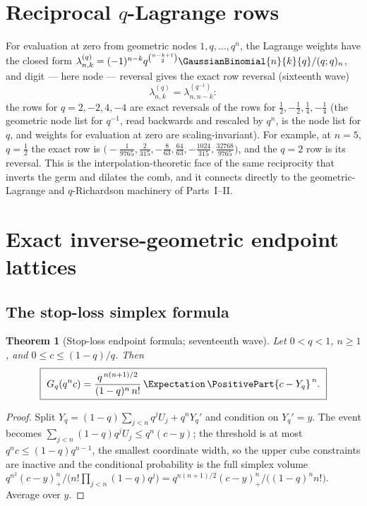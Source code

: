 \documentclass[11pt,oneside]{article}
\numberwithin{equation}{section}
\newtheorem{theorem}{Theorem}[section]
\theoremstyle{definition}
\theoremstyle{remark}
\begin{document}
\section{Reciprocal \texorpdfstring{$q$}{q}-Lagrange rows}
\label{p7:sec:lagrange}

For evaluation at zero from geometric nodes $1,q,\ldots,q^n$, the Lagrange
weights have the closed form
$\lambda^{(q)}_{n,k}=(-1)^{n-k}q^{\binom{n-k+1}2}\GaussianBinomial{n}{k}{q}/(q;q)_n$, and
digit --- here node --- reversal gives the exact row reversal (sixteenth
wave)
\begin{equation}\label{p7:eq:lagrange-reversal}
 \boxed{\ \lambda^{(q)}_{n,k}=\lambda^{(q^{-1})}_{n,n-k}:\ }
\end{equation}
the rows for $q=2,-2,4,-4$ are exact reversals of the rows for
$\tfrac12,-\tfrac12,\tfrac14,-\tfrac14$ (the geometric node list for
$q^{-1}$, read backwards and rescaled by $q^n$, is the node list for $q$, and
weights for evaluation at zero are scaling-invariant).  For example, at
$n=5$, $q=\tfrac12$ the exact row is
$\bigl(-\tfrac1{9765},\tfrac2{315},-\tfrac8{63},\tfrac{64}{63},
-\tfrac{1024}{315},\tfrac{32768}{9765}\bigr)$, and the $q=2$ row is its
reversal.  This is the interpolation-theoretic face of the same reciprocity
that inverts the germ and dilates the comb, and it connects directly to the
geometric-Lagrange and $q$-Richardson machinery of Parts~I--II.
\section{Exact inverse-geometric endpoint lattices}
\label{p7:sec:endpoints}

\subsection{The stop-loss simplex formula}

\begin{theorem}[Stop-loss endpoint formula; seventeenth wave]
\label{p7:thm:stop-loss}
Let $0<q<1$, $n\ge1$, and $0\le c\le(1-q)/q$.  Then
\begin{equation}\label{p7:eq:stop-loss}
 \boxed{\ G_q(q^nc)=
 \frac{q^{\,n(n+1)/2}}{(1-q)^n\,n!}\,
 \Expectation\,\PositivePart{c-Y_q}^{\,n}.\ }
\end{equation}
\end{theorem}

\begin{proof}
Split $Y_q=(1-q)\sum_{j<n}q^jU_j+q^nY_q'$ and condition on $Y_q'=y$.  The
event becomes $\sum_{j<n}(1-q)q^jU_j\le q^n(c-y)$; the threshold is at most
$q^nc\le(1-q)q^{n-1}$, the smallest coordinate width, so the upper cube
constraints are inactive and the conditional probability is the full simplex
volume
$q^{n^2}(c-y)_+^n/\bigl(n!\prod_{j<n}(1-q)q^j\bigr)
=q^{n(n+1)/2}(c-y)_+^n/\bigl((1-q)^nn!\bigr)$.  Average over $y$.
\end{proof}
\end{document}
